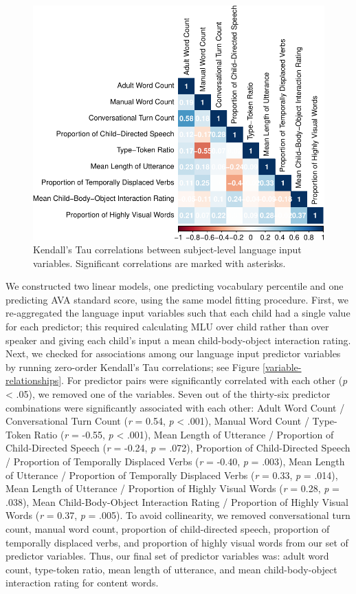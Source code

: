 \documentclass[
  man,floatsintext]{apa6}
\begin{document}
\begin{figure}
\centering
\includegraphics{input_quality_manuscript_files/figure-latex/variable-relationships-1.pdf}
\caption{\label{fig:variable-relationships}Kendall's Tau correlations between subject-level language input variables. Significant correlations are marked with asterisks.}
\end{figure}

We constructed two linear models, one predicting vocabulary percentile and one predicting AVA standard score, using the same model fitting procedure. First, we re-aggregated the language input variables such that each child had a single value for each predictor; this required calculating MLU over child rather than over speaker and giving each child's input a mean child-body-object interaction rating. Next, we checked for associations among our language input predictor variables by running zero-order Kendall's Tau correlations; see Figure \ref{variable-relationships}. For predictor pairs were significantly correlated with each other (\emph{p} \textless{} .05), we removed one of the variables. Seven out of the thirty-six predictor combinations were significantly associated with each other: Adult Word Count / Conversational Turn Count (\emph{r} = 0.54, \emph{p} \textless{} .001), Manual Word Count / Type-Token Ratio (\emph{r} = -0.55, \emph{p} \textless{} .001), Mean Length of Utterance / Proportion of Child-Directed Speech (\emph{r} = -0.24, \emph{p} = .072), Proportion of Child-Directed Speech / Proportion of Temporally Displaced Verbs (\emph{r} = -0.40, \emph{p} = .003), Mean Length of Utterance / Proportion of Temporally Displaced Verbs (\emph{r} = 0.33, \emph{p} = .014), Mean Length of Utterance / Proportion of Highly Visual Words (\emph{r} = 0.28, \emph{p} = .038), Mean Child-Body-Object Interaction Rating / Proportion of Highly Visual Words (\emph{r} = 0.37, \emph{p} = .005). To avoid collinearity, we removed conversational turn count, manual word count, proportion of child-directed speech, proportion of temporally displaced verbs, and proportion of highly visual words from our set of predictor variables. Thus, our final set of predictor variables was: adult word count, type-token ratio, mean length of utterance, and mean child-body-object interaction rating for content words.
\end{document}
